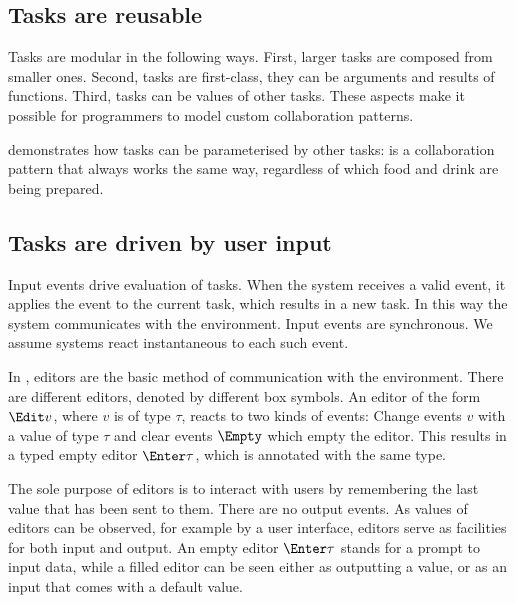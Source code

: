\subsection{Tasks are reusable}

Tasks are modular in the following ways.
First, larger tasks are composed from smaller ones.
Second, tasks are first-class, they can be arguments and results of functions.
Third, tasks can be values of other tasks.
These aspects make it possible for programmers to model custom collaboration patterns.

 demonstrates how tasks can be parameterised by other tasks:  is a collaboration pattern that always works the same way, regardless of which food and drink are being prepared.



\subsection{Tasks are driven by user input}

Input events drive evaluation of tasks.
When the system receives a valid event, it applies the event to the current task, which results in a new task.
In this way the system communicates with the environment.
Input events are synchronous.
We assume systems react instantaneous to each such event.

In \TOPHAT, editors are the basic method of communication with the environment.
There are different editors, denoted by different box symbols.
An editor of the form $\Edit v$, where $v$ is of type $\tau$, reacts to two kinds of events:
Change events $v$ with a value of type $\tau$ and clear events $\Empty$ which empty the editor.
This results in a typed empty editor $\Enter \tau$, which is annotated with the same type.

The sole purpose of editors is to interact with users by remembering the last value that has been sent to them.
There are no output events.
As values of editors can be observed, for example by a user interface, editors serve as facilities for both input and output.
An empty editor $\Enter \tau$ stands for a prompt to input data, while a filled editor can be seen either as outputting a value, or as an input that comes with a default value.

